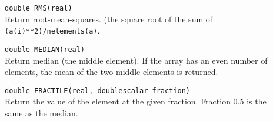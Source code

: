 \begin{description}
  \item[] \texttt{double RMS(real)}\\
    Return root-mean-squares. (the square root of the sum of
    \\\texttt{(a(i)**2)/nelements(a)}.
  \item[] \texttt{double MEDIAN(real)}\\
    Return median (the middle element).
    If the array has an even number of elements, the mean of
    the two middle elements is returned.
  \item[] \texttt{double FRACTILE(real, doublescalar fraction)}\\
    Return the value of the element at the given fraction.
    Fraction 0.5 is the same as the median.
\end{description}

